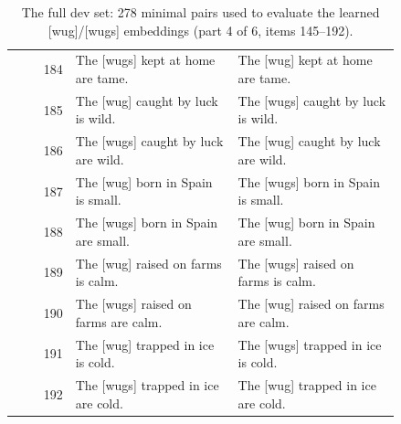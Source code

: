 \begin{table}[p]
\begin{tabular}{@{}rp{0.42\linewidth}p{0.42\linewidth}@{}}
184 & The {[}wugs{]} kept at home are tame. & The {[}wug{]} kept at home are tame. \\
185 & The {[}wug{]} caught by luck is wild. & The {[}wugs{]} caught by luck is wild. \\
186 & The {[}wugs{]} caught by luck are wild. & The {[}wug{]} caught by luck are wild. \\
187 & The {[}wug{]} born in Spain is small. & The {[}wugs{]} born in Spain is small. \\
188 & The {[}wugs{]} born in Spain are small. & The {[}wug{]} born in Spain are small. \\
189 & The {[}wug{]} raised on farms is calm. & The {[}wugs{]} raised on farms is calm. \\
190 & The {[}wugs{]} raised on farms are calm. & The {[}wug{]} raised on farms are calm. \\
191 & The {[}wug{]} trapped in ice is cold. & The {[}wugs{]} trapped in ice is cold. \\
192 & The {[}wugs{]} trapped in ice are cold. & The {[}wug{]} trapped in ice are cold. \\
\hline
\end{tabular}
\caption{The full dev set: 278 minimal pairs used to evaluate the learned {[}wug{]}/{[}wugs{]} embeddings (part 4 of 6, items 145--192).}
\label{tab:dev-set-4}
\end{table}


